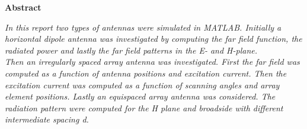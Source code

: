 \newpage
\thispagestyle{empty}
$ $\\
\begin{center}
\Large \bf Abstract
\end{center}

\emph{In this report  two types of antennas were simulated in MATLAB. Initially  a horizontal dipole antenna was investigated by computing the far field function, the radiated power and lastly the far field patterns in the E- and H-plane. }\\

\emph{Then an irregularly spaced array antenna was investigated. First the far field was computed as a function of antenna positions and excitation current. Then the  excitation current was computed as a function of scanning angles and array element positions. Lastly an equispaced array antenna was considered. The radiation pattern were computed for the H plane and broadside with different intermediate spacing d. }

